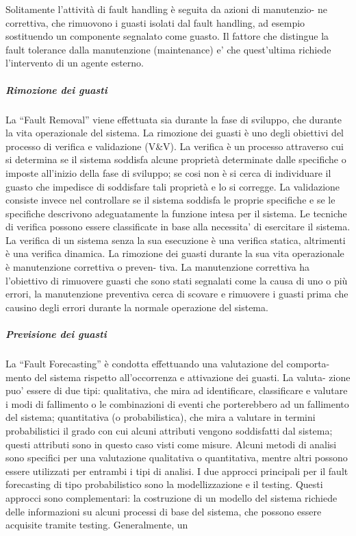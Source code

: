 \documentclass[14pt]{extarticle}
\begin{document}
Solitamente l’attività di fault handling è seguita da azioni di manutenzio-
ne correttiva, che rimuovono i guasti isolati dal fault handling, ad esempio
sostituendo un componente segnalato come guasto. Il fattore che distingue la
fault tolerance dalla manutenzione (maintenance) e’ che quest’ultima richiede
l’intervento di un agente esterno.
\subparagraph{Rimozione dei guasti}
La “Fault Removal” viene effettuata sia durante la fase di sviluppo, che durante la vita operazionale del sistema.
La rimozione dei guasti è uno degli obiettivi del processo di verifica e validazione (V\&V).
La verifica è un processo attraverso cui si determina se il sistema soddisfa alcune proprietà determinate dalle
specifiche o imposte all’inizio della fase di sviluppo; se cosi non è si cerca di
individuare il guasto che impedisce di soddisfare tali proprietà e lo si corregge.
La validazione consiste invece nel controllare se il sistema soddisfa le proprie
specifiche e se le specifiche descrivono adeguatamente la funzione intesa per il
sistema. Le tecniche di verifica possono essere classificate in base alla necessita’ di esercitare il sistema. La verifica di un sistema senza la sua esecuzione
è una verifica statica, altrimenti è una verifica dinamica. La rimozione dei
guasti durante la sua vita operazionale è manutenzione correttiva o preven-
tiva. La manutenzione correttiva ha l’obiettivo di rimuovere guasti che sono
stati segnalati come la causa di uno o più errori, la manutenzione preventiva
cerca di scovare e rimuovere i guasti prima che causino degli errori durante la
normale operazione del sistema.
\subparagraph{Previsione dei guasti}
La “Fault Forecasting” è condotta effettuando una valutazione del comporta-
mento del sistema rispetto all’occorrenza e attivazione dei guasti. La valuta-
zione puo’ essere di due tipi: qualitativa, che mira ad identificare, classificare
e valutare i modi di fallimento o le combinazioni di eventi che porterebbero ad
un fallimento del sistema; quantitativa (o probabilistica), che mira a valutare
in termini probabilistici il grado con cui alcuni attributi vengono soddisfatti
dal sistema; questi attributi sono in questo caso visti come misure. Alcuni
metodi di analisi sono specifici per una valutazione qualitativa o quantitativa, mentre altri possono essere utilizzati per entrambi i tipi di analisi. I due approcci principali per il fault forecasting di tipo probabilistico sono la modellizzazione e il testing. Questi approcci sono complementari: la costruzione di
un modello del sistema richiede delle informazioni su alcuni processi di base
del sistema, che possono essere acquisite tramite testing. Generalmente, un
\end{document}
